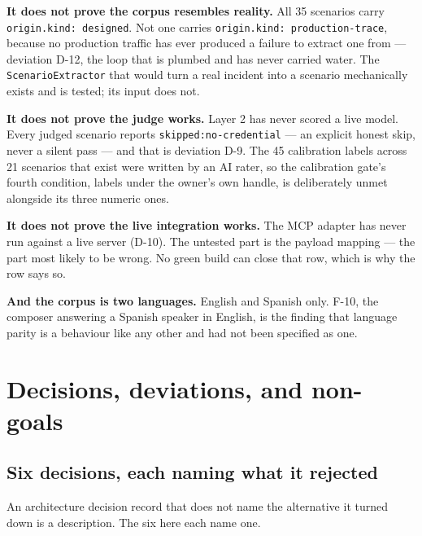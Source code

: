 \documentclass[11pt,a4paper]{article}
\begin{document}
\textbf{It does not prove the corpus resembles reality.} All 35 scenarios carry
\texttt{origin.kind: designed}. Not one carries
\texttt{origin.kind: production-trace}, because no production traffic has ever
produced a failure to extract one from --- deviation D-12, the loop that is
plumbed and has never carried water. The \texttt{ScenarioExtractor} that would
turn a real incident into a scenario mechanically exists and is tested; its
input does not.

\textbf{It does not prove the judge works.} Layer 2 has never scored a live
model. Every judged scenario reports \texttt{skipped:no-credential} --- an
explicit honest skip, never a silent pass --- and that is deviation D-9. The 45
calibration labels across 21 scenarios that exist were written by an AI rater,
so the calibration gate's fourth condition, labels under the owner's own handle,
is deliberately unmet alongside its three numeric ones.

\textbf{It does not prove the live integration works.} The MCP adapter has never
run against a live server (D-10). The untested part is the payload mapping ---
the part most likely to be wrong. No green build can close that row, which is
why the row says so.

\textbf{And the corpus is two languages.} English and Spanish only. F-10, the
composer answering a Spanish speaker in English, is the finding that language
parity is a behaviour like any other and had not been specified as one.

\section{Decisions, deviations, and non-goals}

\subsection{Six decisions, each naming what it rejected}

An architecture decision record that does not name the alternative it turned
down is a description. The six here each name one.
\end{document}
